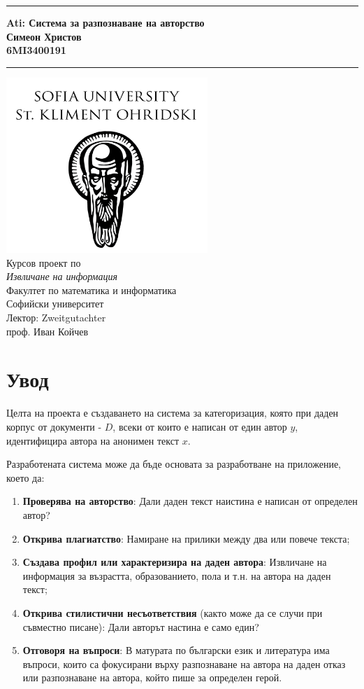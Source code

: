 \documentclass[12pt]{article}
\newcommand{\JMUTitle}[9]{

  \thispagestyle{empty}
  \vspace*{\stretch{1}}
  {\parindent0cm
  \rule{\linewidth}{.7ex}}
  \begin{flushright}
    \vspace*{\stretch{1}}
    \sffamily\bfseries\Huge
    #1\\
    \vspace*{\stretch{1}}
    \sffamily\bfseries\large
    #2\\
    \vspace*{\stretch{1}}
    \sffamily\bfseries\small
    #3
  \end{flushright}
  \rule{\linewidth}{.7ex}

  \vspace*{\stretch{1}}
  \begin{center}
    \includegraphics[width=3in]{./images/logo.png} \\
    \vspace*{\stretch{1}}
    \Large Курсов проект по \\ \textit{Извличане на информация} \\

    \vspace*{\stretch{2}}
    \large Факултет по математика и информатика\\
    \large Софийски университет\\
    
    \vspace*{\stretch{1}}
    \large Лектор: #8 \\[1mm]
    
    \vspace*{\stretch{1}}
    \large #7 \\

  \end{center}
}
\begin{document}
  

  \JMUTitle
      {Ati: Система за разпознаване на авторство}
      {Симеон Христов}
      {6MI3400191}
      
      {Wirtschaftswissenschaftlichen Fakultät}  %
      {W"urzburg 2018}                          %
      {Февруари 2023}                              %
      {проф. Иван Койчев}               %
      {Zweitgutachter}                          %

  \clearpage

\tableofcontents

\clearpage




\section{Увод}

Целта на проекта е създаването на система за категоризация, която при даден корпус от документи - $D$, всеки от които е написан от един автор $y$, идентифицира автора на анонимен текст $x$.

\vspace{1em}

Разработената система може да бъде основата за разработване на приложение, което да:

\begin{enumerate}
    \item \textbf{Проверява на авторство}: Дали даден текст наистина е написан от определен автор?
    \item \textbf{Открива плагиатство}: Намиране на прилики между два или повече текста;
    \item \textbf{Създава профил или характеризира на даден автора}: Извличане на информация за възрастта, образованието, пола и т.н. на автора на даден текст;
    \item \textbf{Открива стилистични несъответствия} (както може да се случи при съвместно писане): Дали авторът настина е само един?
    \item \textbf{Отговоря на въпроси}: В матурата по български език и литература има въпроси, които са фокусирани върху разпознаване на автора на даден отказ или разпознаване на автора, който пише за определен герой.
\end{enumerate}
    
\end{document}
